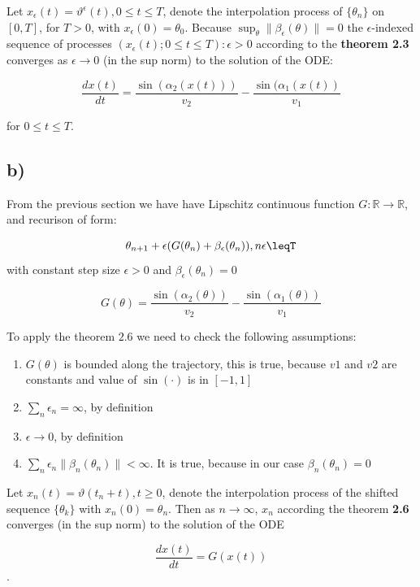\documentclass{article}
\begin{document}
Let $x_{\epsilon}(t)=\vartheta^{\epsilon}(t), 0\leq t \leq T$, denote the interpolation process of $\{\theta_{n}\}$ on $[0, T]$, for $T > 0$, with $x_{\epsilon}(0)=\theta_{0}$. Because $\sup_{\theta}\lVert\beta_{\epsilon}(\theta)\rVert=0$ the $\epsilon$-indexed sequence of processes ${(x_{\epsilon}(t); 0\leq t \leq T): \epsilon > 0}$ according to the \textbf{theorem 2.3} converges as $\epsilon \rightarrow 0$ (in the sup norm) to the solution of the ODE:

$$ \frac{dx(t)}{dt}=\frac{\sin(\alpha_{2}(x(t)))}{v_{2}} - \frac{\sin(\alpha_{1}(x(t))}{v_{1}}$$

for $0 \leq t \leq T$.

\subsection{b)}

From the previous section we have have Lipschitz continuous function $G:\mathbb{R}\rightarrow\mathbb{R}$, and recurison of form:

$$\theta_{n+1}+\epsilon(G(\theta_{n}) + \beta_{\epsilon}(\theta_n)), n\epsilon\leqT$$
with constant step size $\epsilon > 0$ and $\beta_{\epsilon}(\theta_{n})=0$

$$G(\theta) = \frac{\sin(\alpha_{2}(\theta))}{v_{2}} - \frac{\sin(\alpha_{1}(\theta))}{v_{1}}$$

To apply the theorem $2.6$ we need to check the following assumptions:

\begin{enumerate}
    \item $G(\theta)$ is bounded along the trajectory, this is true, because $v1$ and $v2$ are constants and value of $\sin(\cdot)$ is in $[-1, 1]$
    \item $\sum_{n}\epsilon_{n}=\infty$, by definition
    \item $\epsilon\rightarrow 0$, by definition
    \item $\sum_{n}\epsilon_{n}\lVert \beta_{n}(\theta_{n})\rVert < \infty$. It is true, because in our case $\beta_{n}(\theta_{n})=0$
\end{enumerate}

Let $x_n(t)=\vartheta(t_{n}+t), t\geq 0$, denote the interpolation process of the shifted sequence $\{\theta_{k}\}$ with $x_{n}(0)=\theta_{n}$. Then as $n\rightarrow\infty$, $x_{n}$ according the theorem \textbf{2.6} converges (in the sup norm) to the solution of the ODE

$$\frac{dx(t)}{dt}=G(x(t))$$. 
\end{document}
